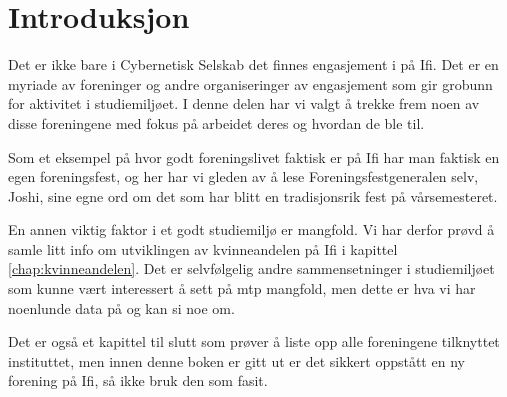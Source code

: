 \chapter*{Introduksjon}

Det er ikke bare i Cybernetisk Selskab det finnes engasjement i på Ifi. Det er en myriade av foreninger og andre organiseringer av engasjement som gir grobunn for aktivitet i studiemiljøet. I denne delen har vi valgt å trekke frem noen av disse foreningene med fokus på arbeidet deres og hvordan de ble til.

Som et eksempel på hvor godt foreningslivet faktisk er på Ifi har man faktisk en egen foreningsfest, og her har vi gleden av å lese Foreningsfestgeneralen selv, Joshi, sine egne ord om det som har blitt en tradisjonsrik fest på vårsemesteret.

En annen viktig faktor i et godt studiemiljø er mangfold. Vi har derfor prøvd å samle litt info om utviklingen av kvinneandelen på Ifi i kapittel \ref{chap:kvinneandelen}. Det er selvfølgelig andre sammensetninger i studiemiljøet som kunne vært interessert å sett på mtp mangfold, men dette er hva vi har noenlunde data på og kan si noe om.

Det er også et kapittel til slutt som prøver å liste opp alle foreningene tilknyttet instituttet, men innen denne boken er gitt ut er det sikkert oppstått en ny forening på Ifi, så ikke bruk den som fasit.

